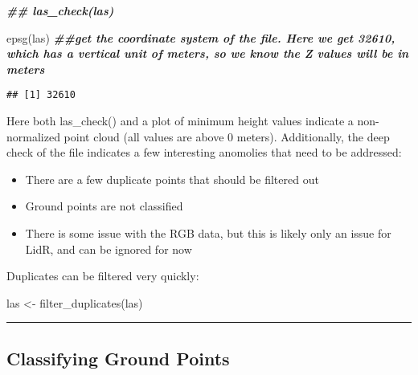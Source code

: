 \documentclass[
]{article}
\newenvironment{Shaded}{\begin{snugshade}}{\end{snugshade}}
\newcommand{\DocumentationTok}[1]{\textcolor[rgb]{0.56,0.35,0.01}{\textbf{\textit{#1}}}}
\newcommand{\FunctionTok}[1]{\textcolor[rgb]{0.00,0.00,0.00}{#1}}
\newcommand{\NormalTok}[1]{#1}
\newcommand{\OtherTok}[1]{\textcolor[rgb]{0.56,0.35,0.01}{#1}}
\providecommand{\tightlist}{%
  \setlength{\itemsep}{0pt}\setlength{\parskip}{0pt}}
\begin{document}
\begin{Shaded}
\begin{Highlighting}[]
\DocumentationTok{\#\# las\_check(las)}

\FunctionTok{epsg}\NormalTok{(las) }\DocumentationTok{\#\#get the coordinate system of the file.  Here we get 32610, which has a vertical unit of meters, so we know the Z values will be in meters}
\end{Highlighting}
\end{Shaded}

\begin{verbatim}
## [1] 32610
\end{verbatim}

\begin{Shaded}
\end{Shaded}

Here both las\_check() and a plot of minimum height values indicate a
non-normalized point cloud (all values are above 0 meters).
Additionally, the deep check of the file indicates a few interesting
anomolies that need to be addressed:

\begin{itemize}
\tightlist
\item
  There are a few duplicate points that should be filtered out
\item
  Ground points are not classified
\item
  There is some issue with the RGB data, but this is likely only an
  issue for LidR, and can be ignored for now
\end{itemize}

Duplicates can be filtered very quickly:

\begin{Shaded}
\begin{Highlighting}[]
\NormalTok{las }\OtherTok{\textless{}{-}} \FunctionTok{filter\_duplicates}\NormalTok{(las)}
\end{Highlighting}
\end{Shaded}

\begin{center}\rule{0.5\linewidth}{0.5pt}\end{center}

\hypertarget{classifying-ground-points}{%
\subsection{Classifying Ground Points}\label{classifying-ground-points}}
\end{document}
